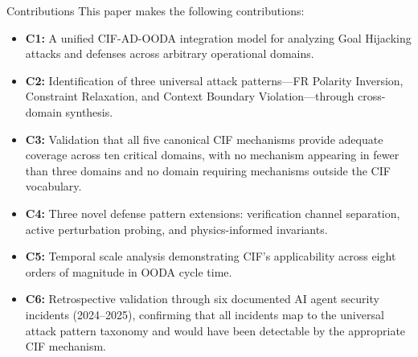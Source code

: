 \documentclass[
  ignorenonframetext,
]{beamer}
\providecommand{\tightlist}{%
  \setlength{\itemsep}{0pt}\setlength{\parskip}{0pt}}
\begin{document}
\begin{frame}[allowframebreaks]{Contributions}
\protect{}\label{contributions}
This paper makes the following contributions:

\begin{itemize}
\tightlist
\item
  \textbf{C1:} A unified CIF-AD-OODA integration model for analyzing
  Goal Hijacking attacks and defenses across arbitrary operational
  domains.
\item
  \textbf{C2:} Identification of three universal attack patterns---FR
  Polarity Inversion, Constraint Relaxation, and Context Boundary
  Violation---through cross-domain synthesis.
\item
  \textbf{C3:} Validation that all five canonical CIF mechanisms provide
  adequate coverage across ten critical domains, with no mechanism
  appearing in fewer than three domains and no domain requiring
  mechanisms outside the CIF vocabulary.
\item
  \textbf{C4:} Three novel defense pattern extensions: verification
  channel separation, active perturbation probing, and physics-informed
  invariants.
\item
  \textbf{C5:} Temporal scale analysis demonstrating CIF's applicability
  across eight orders of magnitude in OODA cycle time.
\item
  \textbf{C6:} Retrospective validation through six documented AI agent
  security incidents (2024--2025), confirming that all incidents map to
  the universal attack pattern taxonomy and would have been detectable
  by the appropriate CIF mechanism.
\end{itemize}
\end{frame}
\end{document}

